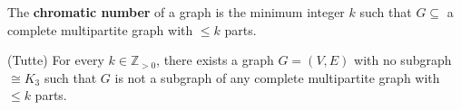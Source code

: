 
\begin{definition}
	The \textbf{chromatic number} of a graph is the minimum integer \( k \) such that \( G \subseteq  \) a complete multipartite graph with \( \le k \) parts.
\end{definition}

\begin{theorem}
	(Tutte) For every \( k \in \mathbb{Z}_{>0} \), there exists a graph \( G=(V,E) \) with no subgraph \( \cong K_3 \) such that \( G \) is not a subgraph of any complete multipartite graph with \( \le k \) parts.
\end{theorem}
